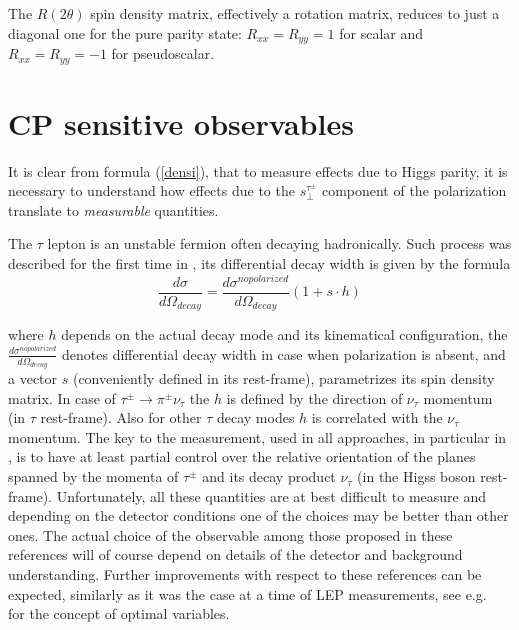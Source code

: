 \documentclass[12pt]{article}
\begin{document}
The $R(2\theta)$ spin density matrix, effectively a rotation matrix,
reduces to just  a diagonal one for the pure parity state: $R_{xx}=R_{yy}=1$ 
for scalar and $R_{xx}=R_{yy}=-1$ for pseudoscalar.

\section {CP sensitive observables}
\label{sec:CPsensitive}

It is clear from formula (\ref{densi}), that to measure effects due to 
Higgs parity, it is necessary to understand how 
effects due to the $s^{\tau^{\pm}}_{\perp}$ component of the polarization translate
to {\it measurable} quantities.


The $\tau$ lepton is an unstable fermion often decaying hadronically. 
Such process was described for the first time in \cite{Tsai:1971vv},  its
differential decay width is given by the formula
\begin{equation}\label{eq:3}
\frac{d\sigma}{d\Omega_{decay}}=\frac{d\sigma^{no polarized}}{d\Omega_{decay}}(1+{s}\cdot{h}) 
\end{equation}

where $h$ depends on the actual decay mode and its kinematical
configuration, the $\frac{d\sigma^{no polarized}}{d\Omega_{decay}}$ denotes
differential decay width in case when polarization is absent, and a vector $s$ (conveniently 
defined in its rest-frame), parametrizes its spin density
matrix.
In case of $\tau^\pm \to \pi^\pm \nu_\tau$ the $h$ 
is defined by the direction of $\nu_\tau$ momentum (in $\tau$ rest-frame). 
Also for other 
$\tau$ decay modes $h$ is correlated with the  $\nu_\tau$ momentum.
The key to the measurement, used in all approaches, in particular in
\cite{Kramer:1994jn,Desch:2003rw,Bower:2002zx,Desch:2003mw,Rouge:2005iy},
is to have at least partial control over the
relative orientation of the  planes spanned by the momenta of $\tau^\pm$ 
and its decay product $\nu_\tau$ (in the Higss boson rest-frame).
Unfortunately, all these quantities are at best difficult to measure and depending
on the detector conditions one of the choices may be better than other ones. 
The actual choice of the observable among those proposed in these references
will of course depend  on details of the  detector and background understanding.
Further improvements with respect to these references can be expected, similarly as it was
the case  at a time of LEP measurements, see e.g.~\cite{Davier:1992nw} for the concept of optimal variables.
\end{document}
